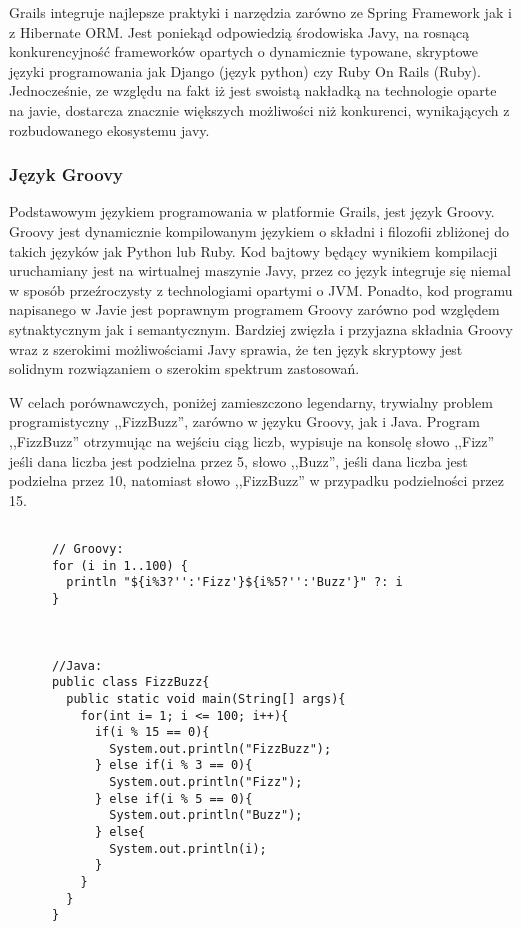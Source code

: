    Grails integruje najlepsze praktyki i narzędzia zarówno ze Spring Framework jak i z Hibernate ORM. Jest poniekąd odpowiedzią środowiska Javy, na rosnącą konkurencyjność frameworków opartych o dynamicznie typowane, skryptowe języki programowania jak Django (język python) czy Ruby On Rails (Ruby). Jednocześnie, ze względu na fakt iż jest swoistą nakładką na technologie oparte na javie, dostarcza znacznie większych możliwości niż konkurenci, wynikających z rozbudowanego ekosystemu javy.


    \subsubsection{Język Groovy}

      Podstawowym językiem programowania w platformie Grails, jest język Groovy. Groovy jest dynamicznie kompilowanym językiem o składni i filozofii zbliżonej do takich języków jak Python lub Ruby. Kod bajtowy będący wynikiem kompilacji uruchamiany jest na wirtualnej maszynie Javy, przez co język integruje się niemal w sposób przeźroczysty z technologiami opartymi o JVM. Ponadto, kod programu napisanego w Javie jest poprawnym programem Groovy zarówno pod względem sytnaktycznym jak i semantycznym. Bardziej zwięzła i przyjazna składnia Groovy wraz z szerokimi możliwościami Javy sprawia, że ten język skryptowy jest solidnym rozwiązaniem o szerokim spektrum zastosowań.

      W celach porównawczych, poniżej zamieszczono legendarny, trywialny problem programistyczny ,,FizzBuzz'', zarówno w języku Groovy, jak i Java. Program ,,FizzBuzz'' otrzymując na wejściu ciąg liczb, wypisuje na konsolę słowo ,,Fizz'' jeśli dana liczba jest podzielna przez 5, słowo ,,Buzz'', jeśli dana liczba jest podzielna przez 10, natomiast słowo ,,FizzBuzz'' w przypadku podzielności przez 15.

    \begin{verbatim}

      // Groovy:
      for (i in 1..100) {
        println "${i%3?'':'Fizz'}${i%5?'':'Buzz'}" ?: i
      }    



      //Java:
      public class FizzBuzz{
        public static void main(String[] args){
          for(int i= 1; i <= 100; i++){
            if(i % 15 == 0){
              System.out.println("FizzBuzz");
            } else if(i % 3 == 0){
              System.out.println("Fizz");
            } else if(i % 5 == 0){
              System.out.println("Buzz");
            } else{
              System.out.println(i);
            }
          }
        }
      }

    \end{verbatim}

